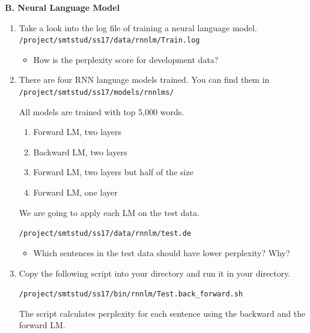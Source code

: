 \documentclass[12pt,fleqn]{article}
\begin{document}
\newpage 

\vspace{0.5cm} 
\textbf{B. Neural Language Model} \\ 

\begin{enumerate} 

\item Take a look into the log file of training a neural language model. \\ 
\texttt{/project/smtstud/ss17/data/rnnlm/Train.log} \\ 

\begin{itemize} 
 \item How is the perplexity score for development data? 
\end{itemize}



\item There are four RNN language models trained. You can find them in \\ 
\texttt{/project/smtstud/ss17/models/rnnlms/} 

All models are trained with top 5,000 words. 
\begin{enumerate} 
 \item Forward LM, two layers 
 \item Backward LM, two layers 
 \item Forward LM, two layers but half of the size  
 \item Forward LM, one layer 
\end{enumerate}

We are going to apply each LM on the test data. 

\texttt{/project/smtstud/ss17/data/rnnlm/test.de} \\ 

\begin{itemize} 
 \item Which sentences in the test data should have lower perplexity? Why? 
\end{itemize}

\newpage 

\item Copy the following script into your directory and run it in your directory. 

\texttt{/project/smtstud/ss17/bin/rnnlm/Test.back\_forward.sh} 

The script calculates perplexity for each sentence using the backward and the forward LM. 


\end{enumerate}
\end{document}
